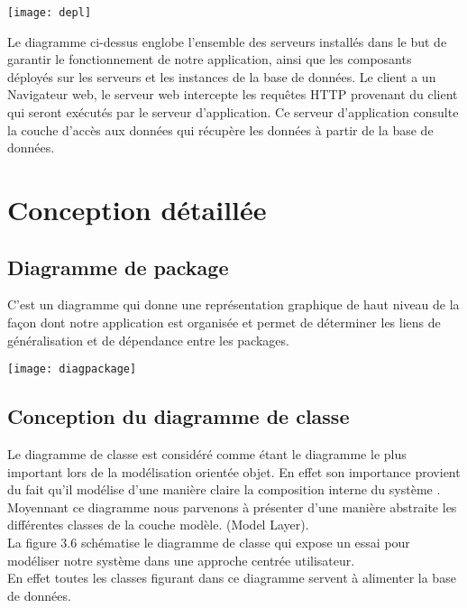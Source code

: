 \documentclass[a4paper,12pt,oneside]{report}
\begin{document}
\begin{center}
\texttt{[image: depl]}

\label{fig1}
\end{center}
Le diagramme ci-dessus englobe l'ensemble des serveurs installés dans le but de garantir
le fonctionnement de notre application, ainsi que les composants déployés sur les serveurs
et les instances de la base de données. Le client a un Navigateur web, le serveur web intercepte les requêtes HTTP provenant du client qui seront  exécutés par le serveur d'application. Ce serveur d'application consulte la couche d'accès aux données qui   récupère les données à partir de la base de données.
\section{Conception détaillée }
\subsection{Diagramme de package}
C'est un diagramme qui donne une représentation graphique de haut niveau de la façon dont notre application est organisée et permet de déterminer les liens de généralisation et de dépendance entre les packages.
  \begin{center}
    
\texttt{[image: diagpackage]}

\label{fig1}
\end{center}
\subsection{ Conception du diagramme de classe}
Le diagramme de classe est considéré comme étant le diagramme le plus important lors de la modélisation orientée objet.
En effet son importance provient du fait qu'il modélise d'une manière claire la composition interne du système . \\
Moyennant ce diagramme nous parvenons à présenter d'une manière abstraite les différentes classes de la couche modèle. (Model Layer). \\

   La figure 3.6 schématise le diagramme de classe qui expose un essai pour modéliser notre système dans une approche centrée utilisateur.\\
En effet toutes les classes figurant dans ce diagramme servent à alimenter la base de données.
 
\end{document}
